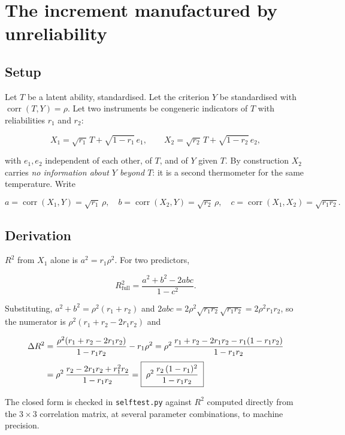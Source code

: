 \section{The increment manufactured by unreliability}
\label{app:spurious}

\subsection{Setup}

Let $T$ be a latent ability, standardised. Let the criterion $Y$ be standardised
with $\operatorname{corr}(T,Y)=\rho$. Let two instruments be congeneric
indicators of $T$ with reliabilities $r_1$ and $r_2$:

\[
X_1=\sqrt{r_1}\,T+\sqrt{1-r_1}\,e_1,
\qquad
X_2=\sqrt{r_2}\,T+\sqrt{1-r_2}\,e_2,
\]

with $e_1,e_2$ independent of each other, of $T$, and of $Y$ given $T$. By
construction $X_2$ carries \emph{no information about $Y$ beyond $T$}: it is a
second thermometer for the same temperature. Write

\[
a=\operatorname{corr}(X_1,Y)=\sqrt{r_1}\,\rho,\quad
b=\operatorname{corr}(X_2,Y)=\sqrt{r_2}\,\rho,\quad
c=\operatorname{corr}(X_1,X_2)=\sqrt{r_1r_2}.
\]

\subsection{Derivation}

$R^2$ from $X_1$ alone is $a^2=r_1\rho^2$. For two predictors,

\[
R^2_{\text{full}}=\frac{a^2+b^2-2abc}{1-c^2}.
\]

Substituting, $a^2+b^2 = \rho^2(r_1+r_2)$ and
$2abc = 2\rho^2\sqrt{r_1r_2}\sqrt{r_1r_2}=2\rho^2 r_1r_2$, so the numerator is
$\rho^2(r_1+r_2-2r_1r_2)$ and

\begin{align}
\Delta R^{2} &= \frac{\rho^2(r_1+r_2-2r_1r_2)}{1-r_1r_2}-r_1\rho^2
     = \rho^2\,\frac{r_1+r_2-2r_1r_2-r_1(1-r_1r_2)}{1-r_1r_2} \notag\\[0.3em]
    &= \rho^2\,\frac{r_2-2r_1r_2+r_1^2r_2}{1-r_1r_2}
     = \boxed{\;\rho^{2}\,\frac{r_2\,(1-r_1)^{2}}{1-r_1r_2}\;}
\end{align}

The closed form is checked in \texttt{selftest.py} against $R^2$ computed
directly from the $3\times3$ correlation matrix, at several parameter
combinations, to machine precision.

